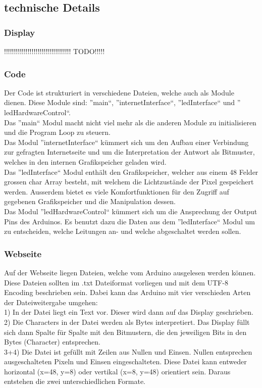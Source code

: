 \documentclass[10pt,a4paper]{article}
\begin{document}
\subsection{technische Details}

\subsubsection{Display}

!!!!!!!!!!!!!!!!!!!!!!!!!!!!!!!!!! TODO!!!!!\\

\subsubsection{Code}

Der Code ist strukturiert in verschiedene Dateien, welche auch als Module dienen. Diese Module sind: ''main``, ''internetInterface``, ''ledInterface`` und '' ledHardwareControl``.\\
Das ''main`` Modul macht nicht viel mehr als die anderen Module zu initialisieren und die Program Loop zu steuern.\\
Das Modul ''internetInterface`` kümmert sich um den Aufbau einer Verbindung zur gefragten Internetseite und um die Interpretation der Antwort als Bitmuster, welches in den internen Grafikspeicher geladen wird.\\
Das ''ledInterface`` Modul enthält den Grafikspeicher, welcher aus einem 48 Felder grossen char Array besteht, mit welchem die Lichtzustände der Pixel gespeichert werden. Ausserdem bietet es viele Komfortfunktionen für den Zugriff auf gegebenen Grafikspeicher und die Manipulation dessen.\\
Das Modul ''ledHardwareControl`` kümmert sich um die Ansprechung der Output Pins des Arduinos. Es benutzt dazu die Daten aus dem ''ledInterface`` Modul um zu entscheiden, welche Leitungen an- und welche abgeschaltet werden sollen.\\

\subsubsection{Webseite}

Auf der Webseite liegen Dateien, welche vom Arduino ausgelesen werden können. Diese Dateien sollten im .txt Dateiformat vorliegen und mit dem UTF-8 Encoding beschrieben sein. Dabei kann das Arduino mit vier verschieden Arten der Dateiweitergabe umgehen:\\
1) In der Datei liegt ein Text vor. Dieser wird dann auf das Display geschrieben.\\
2) Die Characters in der Datei werden als Bytes interpretiert. Das Display füllt sich dann Spalte für Spalte mit den Bitmustern, die den jeweiligen Bits in den Bytes (Character) entsprechen.\\
3+4) Die Datei ist gefüllt mit Zeilen aus Nullen und Einsen. Nullen entsprechen ausgeschalteten Pixeln und Einsen eingeschalteten. Diese Datei kann entweder horizontal (x=48, y=8) oder vertikal (x=8, y=48) orientiert sein. Daraus entstehen die zwei unterschiedlichen Formate.\\
\end{document}
